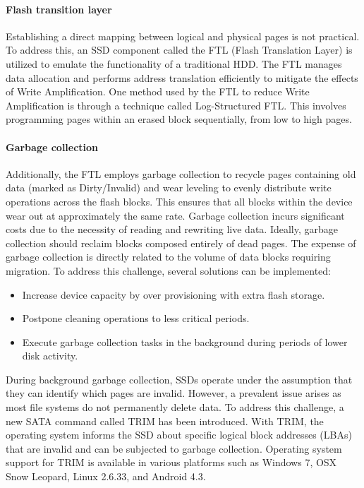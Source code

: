 \paragraph*{Flash transition layer}
Establishing a direct mapping between logical and physical pages is not practical. 
To address this, an SSD component called the FTL (Flash Translation Layer) is utilized to emulate the functionality of a traditional HDD.\@ 
The FTL manages data allocation and performs address translation efficiently to mitigate the effects of Write Amplification.
One method used by the FTL to reduce Write Amplification is through a technique called Log-Structured FTL.\@ 
This involves programming pages within an erased block sequentially, from low to high pages.

\paragraph*{Garbage collection}
Additionally, the FTL employs garbage collection to recycle pages containing old data (marked as Dirty/Invalid) and wear leveling to evenly distribute write operations across the flash blocks. 
This ensures that all blocks within the device wear out at approximately the same rate.
Garbage collection incurs significant costs due to the necessity of reading and rewriting live data. 
Ideally, garbage collection should reclaim blocks composed entirely of dead pages. 
The expense of garbage collection is directly related to the volume of data blocks requiring migration. 
To address this challenge, several solutions can be implemented:
\begin{itemize}
    \item Increase device capacity by over provisioning with extra flash storage.
    \item Postpone cleaning operations to less critical periods.
    \item Execute garbage collection tasks in the background during periods of lower disk activity.
\end{itemize}
During background garbage collection, SSDs operate under the assumption that they can identify which pages are invalid. 
However, a prevalent issue arises as most file systems do not permanently delete data. 
To address this challenge, a new SATA command called TRIM has been introduced.
With TRIM, the operating system informs the SSD about specific logical block addresses (LBAs) that are invalid and can be subjected to garbage collection. 
Operating system support for TRIM is available in various platforms such as Windows 7, OSX Snow Leopard, Linux 2.6.33, and Android 4.3.

